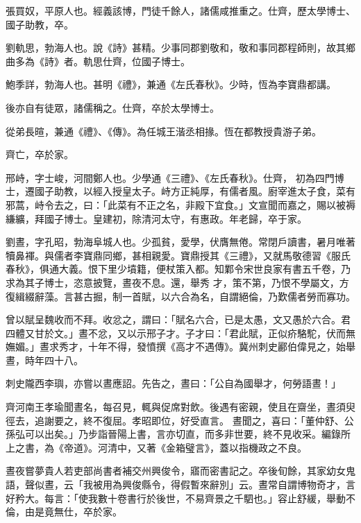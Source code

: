 \begin{pinyinscope}
 張買奴，平原人也。經義該博，門徒千餘人，諸儒咸推重之。仕齊，歷太學博士、國子助教，卒。



 劉軌思，勃海人也。說《詩》甚精。少事同郡劉敬和，敬和事同郡程師則，故其鄉曲多為《詩》者。軌思仕齊，位國子博士。



 鮑季詳，勃海人也。甚明《禮》，兼通《左氏春秋》。少時，恆為李寶鼎都講。



 後亦自有徒眾，諸儒稱之。仕齊，卒於太學博士。



 從弟長暄，兼通《禮》、《傳》。為任城王湝丞相掾。恆在都教授貴游子弟。



 齊亡，卒於家。



 邢峙，字士峻，河間鄭人也。少學通《三禮》、《左氏春秋》。仕齊，
 初為四門博士，遷國子助教，以經入授皇太子。峙方正純厚，有儒者風。廚宰進太子食，菜有邪蒿，峙令去之，曰：「此菜有不正之名，非殿下宜食。」文宣聞而嘉之，賜以被褥縑纊，拜國子博士。皇建初，除清河太守，有惠政。年老歸，卒于家。



 劉晝，字孔昭，勃海阜城人也。少孤貧，愛學，伏膺無倦。常閉戶讀書，暑月唯著犢鼻褌。與儒者李寶鼎同鄉，甚相親愛。寶鼎授其《三禮》，又就馬敬德習《服氏春秋》，俱通大義。恨下里少墳籍，便杖策入都。知鄴令宋世良家有書五千卷，乃求為其子博士，恣意披覽，晝夜不息。還，舉秀
 才，策不第，乃恨不學屬文，方復緝綴辭藻。言甚古掘，制一首賦，以六合為名，自謂絕倫，乃歎儒者勞而寡功。



 曾以賦呈魏收而不拜。收忿之，謂曰：「賦名六合，已是太愚，文又愚於六合。君四體又甘於文。」晝不忿，又以示邢子才。子才曰：「君此賦，正似疥駱駝，伏而無嫵媚。」晝求秀才，十年不得，發憤撰《高才不遇傳》。冀州刺史酈伯偉見之，始舉晝，時年四十八。



 刺史隴西李璵，亦嘗以晝應詔。先告之，晝曰：「公自為國舉才，何勞語晝！」



 齊河南王孝瑜聞晝名，每召見，輒與促席對飲。後遇有密親，使且在齋坐，晝須臾徑去，追謝要之，終不復屈。孝昭即位，好受直言。
 晝聞之，喜曰：「董仲舒、公孫弘可以出矣。」乃步詣晉陽上書，言亦切直，而多非世要，終不見收采。編錄所上之書，為《帝道》。河清中，又著《金箱璧言》，蓋以指機政之不良。



 晝夜嘗夢貴人若吏部尚書者補交州興俊令，寤而密書記之。卒後旬餘，其家幼女鬼語，聲似晝，云「我被用為興俊縣令，得假暫來辭別」云。晝常自謂博物奇才，言好矜大。每言：「使我數十卷書行於後世，不易齊景之千駟也。」容止舒緩，舉動不倫，由是竟無仕，卒於家。




\end{pinyinscope}
